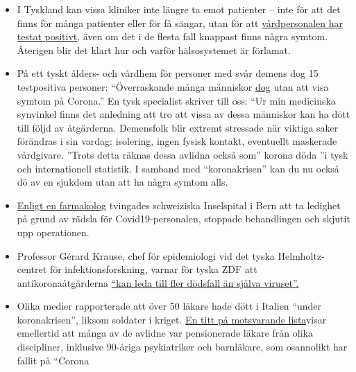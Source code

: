 \begin{itemize}
\tightlist
\item
  I Tyskland kan vissa kliniker inte längre ta emot patienter -- inte
  för att det finns för många patienter eller för få sängar, utan för
  att
  \href{https://web.archive.org/web/20200330082928/https://www.sueddeutsche.de/panorama/coronavirus-news-deutschland-wolfsburg-laschet-1.4828033}{vårdpersonalen
  har testat positivt}, även om det i de flesta fall knappast finns
  några symtom. Återigen blir det klart hur och varför hälsosystemet är
  förlamat.
\item
  På ett tyskt ålders- och vårdhem för personer med svår demens dog 15
  testpositiva personer: ``Överraskande många människor
  \href{https://web.archive.org/web/20200330082928/https://www.sueddeutsche.de/panorama/coronavirus-news-deutschland-wolfsburg-laschet-1.4828033}{dog}
  utan att visa symtom på Corona.'' En tysk specialist skriver till oss:
  ``Ur min medicinska synvinkel finns det anledning att tro att vissa av
  dessa människor kan ha dött till följd av åtgärderna. Demensfolk blir
  extremt stressade när viktiga saker förändras i sin vardag: isolering,
  ingen fysisk kontakt, eventuellt maskerade vårdgivare. ''Trots detta
  räknas dessa avlidna också som'' korona döda ''i tysk och
  internationell statistik. I samband med ``koronakrisen'' kan du nu
  också dö av en sjukdom utan att ha några symtom alls.
\item
  \href{https://twitter.com/sneatio/status/1244157986832101376}{Enligt
  en farmakolog} tvingades schweiziska Inselspital i Bern att ta
  ledighet på grund av rädsla för Covid19-personalen, stoppade
  behandlingen och skjutit upp operationen.
\item
  Professor Gérard Krause, chef för epidemiologi vid det tyska
  Helmholtz-centret för infektionsforskning, varnar för tyska ZDF att
  antikoronaåtgärderna
  \href{https://www.zdf.de/nachrichten/politik/coronavirus-epidemiologe-folgen-helmholtz-100.html}{``kan
  leda till fler dödsfall än själva viruset''.}
\item
  Olika medier rapporterade att över 50 läkare hade dött i Italien
  ``under koronakrisen'', liksom soldater i kriget.
  \href{https://web.archive.org/web/20200328152430/https://portale.fnomceo.it/elenco-dei-medici-caduti-nel-corso-dellepidemia-di-covid-19/}{En
  titt på motsvarande lista}visar emellertid att många av de avlidne var
  pensionerade läkare från olika discipliner, inklusive 90-åriga
  psykiatriker och barnläkare, som osannolikt har fallit på ``Corona

\end{itemize}
